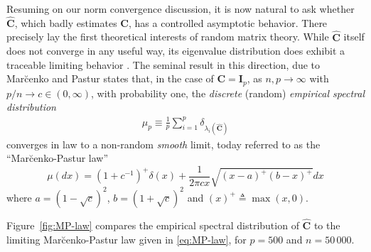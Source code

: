 \documentclass[MAL,biber]{nowfnt} %
\newcommand{\C}{{\mathbf{C}}}
\newcommand{\I}{{\mathbf{I}}}
\begin{document}
Resuming on our norm convergence discussion, it is now natural to ask whether $\hat \C$, which badly estimates $\C$, has a controlled asymptotic behavior. There precisely lay the first theoretical interests of random matrix theory. While $\hat\C$ itself does not converge in any useful way, its eigenvalue distribution does exhibit a traceable limiting behavior \citep{marvcenko1967distribution,silverstein1995empirical,bai2010spectral}. The seminal result in this direction, due to Mar\u{c}enko and Pastur states that, in the case of $\C = \I_p$, as $n,p \to \infty $ with $p/n \to c \in (0,\infty)$, with probability one, the \emph{discrete} (random) \emph{empirical spectral distribution} 
\begin{align*}
\mu_p\equiv \frac1p\sum_{i=1}^p \delta_{\lambda_i(\hat\C)}
\end{align*}
converges in law to a non-random \emph{smooth} limit, today referred to as the ``Mar{\u c}enko-Pastur law'' \citep{marvcenko1967distribution}
\begin{equation}\label{eq:MP-law}
    \mu(dx) = (1+c^{-1})^+ \delta(x) + \frac1{2\pi c x} \sqrt{ (x-a)^+ (b-x)^+ }dx
\end{equation}
where $a = (1 - \sqrt{c})^2$, $b = (1 + \sqrt{c})^2$ and $(x)^+ \triangleq \max(x,0)$. 

Figure~\ref{fig:MP-law} compares the empirical spectral distribution of $\hat \C$ to the limiting Mar{\u c}enko-Pastur law given in \eqref{eq:MP-law}, for $p=500$ and $n=50\,000$.
\end{document}
